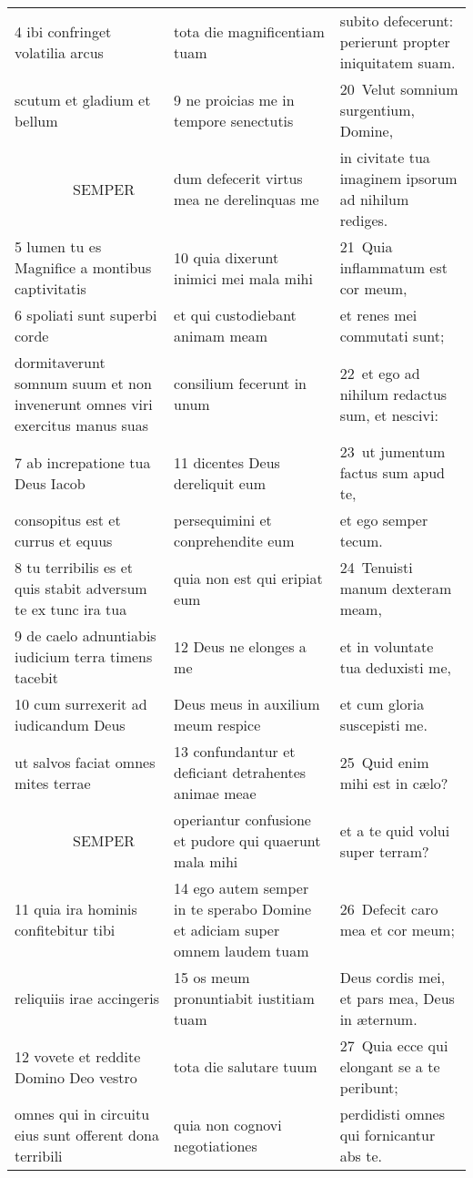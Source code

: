 \documentclass{article}
\begin{document}
\begin{longtable}{@{}p{}p{}p{}@{}}
4 ibi confringet volatilia arcus	&	tota die magnificentiam tuam	&	subito defecerunt: perierunt propter iniquitatem suam.	\\
scutum et gladium et bellum	&	9 ne proicias me in tempore senectutis	&	20 Velut somnium surgentium, Domine,	\\
    SEMPER	&	dum defecerit virtus mea ne derelinquas me	&	in civitate tua imaginem ipsorum ad nihilum rediges.	\\
5 lumen tu es Magnifice a montibus captivitatis	&	10 quia dixerunt inimici mei mala mihi	&	21 Quia inflammatum est cor meum,	\\
6 spoliati sunt superbi corde	&	et qui custodiebant animam meam	&	et renes mei commutati sunt;	\\
dormitaverunt somnum suum et non invenerunt omnes viri exercitus manus suas	&	consilium fecerunt in unum	&	22 et ego ad nihilum redactus sum, et nescivi:	\\
7 ab increpatione tua Deus Iacob	&	11 dicentes Deus dereliquit eum	&	23 ut jumentum factus sum apud te,	\\
consopitus est et currus et equus	&	persequimini et conprehendite eum	&	et ego semper tecum.	\\
8 tu terribilis es et quis stabit adversum te ex tunc ira tua	&	quia non est qui eripiat eum	&	24 Tenuisti manum dexteram meam,	\\
9 de caelo adnuntiabis iudicium terra timens tacebit	&	12 Deus ne elonges a me	&	et in voluntate tua deduxisti me,	\\
10 cum surrexerit ad iudicandum Deus	&	Deus meus in auxilium meum respice	&	et cum gloria suscepisti me.	\\
ut salvos faciat omnes mites terrae	&	13 confundantur et deficiant detrahentes animae meae	&	25 Quid enim mihi est in cælo?	\\
    SEMPER	&	operiantur confusione et pudore qui quaerunt mala mihi	&	et a te quid volui super terram?	\\
11 quia ira hominis confitebitur tibi	&	14 ego autem semper in te sperabo Domine et adiciam super omnem laudem tuam	&	26 Defecit caro mea et cor meum;	\\
reliquiis irae accingeris	&	15 os meum pronuntiabit iustitiam tuam	&	Deus cordis mei, et pars mea, Deus in æternum.	\\
12 vovete et reddite Domino Deo vestro	&	tota die salutare tuum	&	27 Quia ecce qui elongant se a te peribunt;	\\
omnes qui in circuitu eius sunt offerent dona terribili	&	quia non cognovi negotiationes	&	perdidisti omnes qui fornicantur abs te.	\\

\end{longtable}
\end{document}
